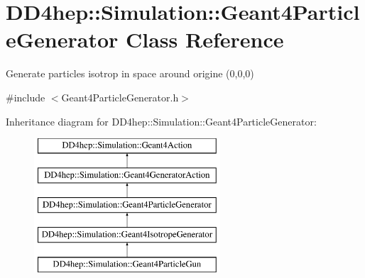\hypertarget{class_d_d4hep_1_1_simulation_1_1_geant4_particle_generator}{}\section{D\+D4hep\+:\+:Simulation\+:\+:Geant4\+Particle\+Generator Class Reference}
\label{class_d_d4hep_1_1_simulation_1_1_geant4_particle_generator}


Generate particles isotrop in space around origine (0,0,0)  




{\ttfamily \#include $<$Geant4\+Particle\+Generator.\+h$>$}

Inheritance diagram for D\+D4hep\+:\+:Simulation\+:\+:Geant4\+Particle\+Generator\+:\begin{figure}[H]
\begin{center}
\leavevmode
\includegraphics[height=5.000000cm]{class_d_d4hep_1_1_simulation_1_1_geant4_particle_generator}
\end{center}
\end{figure}
